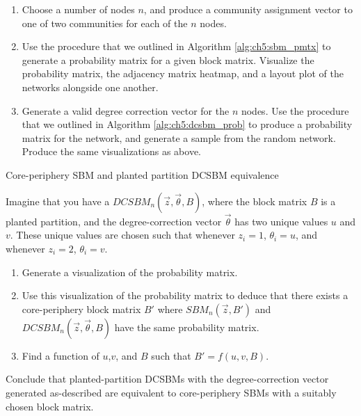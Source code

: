 \begin{enumerate}
    \item Choose a number of nodes $n$, and produce a community assignment vector to one of two communities for each of the $n$ nodes.
    \item Use the procedure that we outlined in Algorithm \ref{alg:ch5:sbm_pmtx} to generate a probability matrix for a given block matrix. Visualize the probability matrix, the adjacency matrix heatmap, and a layout plot of the networks alongside one another. 
    \item Generate a valid degree correction vector for the $n$ nodes. Use the procedure that we outlined in Algorithm \ref{alg:ch5:dcsbm_prob} to produce a probability matrix for the network, and generate a sample from the random network. Produce the same visualizations as above.
\end{enumerate}

\begin{floatingbox}[h]\caption{Core-periphery SBM and planted partition DCSBM equivalence}
Imagine that you have a $DCSBM_n(\vec z, \vec \theta, B)$, where the block matrix $B$ is a planted partition, and the degree-correction vector $\vec \theta$ has two unique values $u$ and $v$. These unique values are chosen such that whenever $z_i = 1$, $\theta_i = u$, and whenever $z_i = 2$, $\theta_i = v$. 
\begin{enumerate}
    \item Generate a visualization of the probability matrix.
    \item Use this visualization of the probability matrix to deduce that there exists a core-periphery block matrix $B'$ where $SBM_n(\vec z, B')$ and $DCSBM_n(\vec z, \vec \theta, B)$ have the same probability matrix.
    \item Find a function of $u$,$v$, and $B$ such that $B' = f(u, v, B)$. 
\end{enumerate}
Conclude that planted-partition DCSBMs with the degree-correction vector generated as-described are equivalent to core-periphery SBMs with a suitably chosen block matrix.
\end{floatingbox}
\newpage

